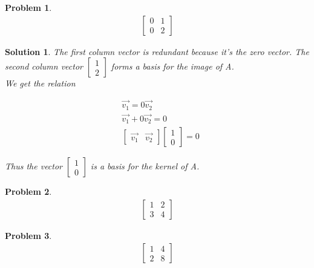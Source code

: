 \documentclass{article}
\newtheorem{problem}{Problem}
\newtheorem*{solution}{Solution}
\begin{document}
\begin{problem}
\begin{align*}
\begin{bmatrix}
0 & 1 \\ 0 & 2
\end{bmatrix}
\end{align*}
\end{problem}

\begin{solution}
The first column vector is redundant because it's the zero vector. The second column vector $\begin{bmatrix} 1 \\ 2 \end{bmatrix}$ forms a basis for the image of A. \\

We get the relation

\begin{align*}
& \vec{v_{1}} = 0\vec{v_{2}} \\
& \vec{v_{1}} + 0\vec{v_{2}} = 0 \\
& \begin{bmatrix} \vec{v_{1}} & \vec{v_{2}} \end{bmatrix} \begin{bmatrix}1 \\ 0 \end{bmatrix} = 0
\end{align*}

Thus the vector $\begin{bmatrix}1 \\ 0 \end{bmatrix}$ is a basis for the kernel of A.

\end{solution}


\begin{problem}
\begin{align*}
\begin{bmatrix}
1 & 2 \\ 3 & 4
\end{bmatrix}
\end{align*}
\end{problem}

\begin{problem}
\begin{align*}
\begin{bmatrix}
1 & 4 \\ 2 & 8
\end{bmatrix}
\end{align*}
\end{problem}
\end{document}
